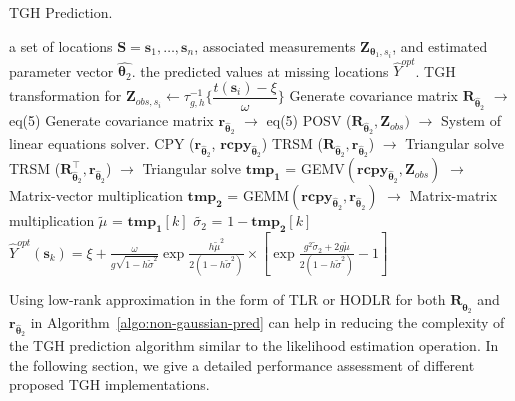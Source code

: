 \documentclass[conference]{IEEEtran}
\begin{document}
\begin{algorithm}[H]
\footnotesize
\caption{TGH Prediction.}
\label{algo:non-gaussian-pred}
\begin{algorithmic}[1]
 a set of locations $\bm{S} = \bm s_1,\ldots,\bm s_n$,   associated measurements $\bm{Z}_{\bm{\theta}_1,s_i}$, and estimated parameter vector $\widehat{\bm{\theta}_2}$.
 the predicted values at missing locations $\widehat{Y}^{opt}$.
\STATE TGH transformation for $\bm{Z}_{obs,s_i} \leftarrow \tau_{g,h}^{-1} \bigg \{ \dfrac{t(\bm{s}_i) - \xi}{\omega} \bigg \}$
\STATE  Generate covariance matrix $\bm{R}_{\widehat{\bm{\theta}}_2}$ $\rightarrow$ eq(5)
    \STATE Generate covariance matrix $\bm{r}_{\widehat{\bm{\theta}}_2}$  $\rightarrow$ eq(5)
\STATE  POSV ($\bm{R}_{\widehat{\bm{\theta}}_2}, \bm{Z}_{obs})$ $\rightarrow$ System of linear equations solver.
        \STATE CPY ($\bm{r}_{\widehat{\bm{\theta}}_2}$, $\bm{rcpy}_{\widehat{\bm{\theta}}_2}$) 
    \STATE TRSM ($\bm{R}_{\widehat{\bm{\theta}}_2}, \bm{r}_{\widehat{\bm{\theta}}_2}$) $\rightarrow$ Triangular solve
        \STATE TRSM ($\bm{R}_{\widehat{\bm{\theta}}_2}^\top, \bm{r}_{\widehat{\bm{\theta}}_2}$) $\rightarrow$ Triangular solve
                \STATE $\bm{tmp_1}$ = GEMV$(\bm{rcpy}_{\widehat{\bm{\theta}}_2}, \bm{Z}_{obs})$ $\rightarrow$ Matrix-vector multiplication 
                \STATE $\bm{tmp_2}$ = GEMM$ (\bm{rcpy}_{\widehat{\bm{\theta}}_2}, \bm{r}_{\widehat{\bm{\theta}}_2})$ $\rightarrow$ Matrix-matrix multiplication 
                \STATE $\tilde{\mu}$ =  $\bm{tmp_1}[k]$
        \STATE $\tilde{\sigma_2}$ = $1-\bm{tmp_2}[k]$
        \STATE $\widehat{Y}^{opt}(\bm{s}_k)=\xi +  \frac{\omega}{g\sqrt{1-h\tilde{\sigma}^2}} \exp{\frac{h\tilde{\mu}^2}{2(1-h\tilde{\sigma}^2)}}      \times [\exp{\frac{g^2\tilde{\sigma}_2+2g\tilde{\mu}}{2(1-h\tilde{\sigma}^2)}-1}] $
  \ENDFOR
\end{algorithmic}
\end{algorithm}


Using low-rank approximation in the form of TLR or HODLR for both $\bm{R}_{\widehat{\bm{\theta}}_2}$ and $\bm{r}_{\widehat{\bm{\theta}}_2}$  in
 Algorithm~\ref{algo:non-gaussian-pred} can help
in reducing the complexity of the TGH prediction algorithm
similar to the likelihood estimation operation. In the following
section, we give a detailed performance assessment of different
proposed TGH implementations.
\end{document}
